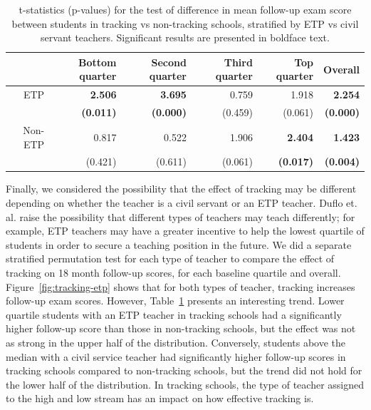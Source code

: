 \documentclass[11pt]{article}
\begin{document}
\begin{table}[ht]
\centering
\begin{tabular}{rrrrrr}
  \hline
 & Bottom quarter & Second quarter & Third quarter & Top quarter & Overall \\ 
  \hline
  ETP & {\bf 2.506} & {\bf 3.695} & 0.759 & 1.918 & {\bf 2.254 }\\ \vspace{2mm}
   & {\bf(0.011)} & {\bf (0.000) }& (0.459) & (0.061) & {\bf (0.000) }\\ 
  Non-ETP & 0.817 & 0.522 & 1.906 & {\bf 2.404 }& {\bf 1.423} \\ 
   & (0.421) & (0.611) & (0.061) & {\bf (0.017)} & {\bf (0.004)} \\ 
   \hline
\end{tabular}
\caption{t-statistics (p-values) for the test of difference in mean follow-up exam score between students in tracking vs non-tracking schools, stratified by ETP vs civil servant teachers. Significant results are presented in boldface text.}  \label{tab:tracking-etp}
\end{table} %

Finally, we considered the possibility that the effect of tracking may be different depending on whether the teacher is a civil servant or an ETP teacher. Duflo et. al. raise the possibility that different types of teachers may teach differently; for example, ETP teachers may have a greater incentive to help the lowest quartile of students in order to secure a teaching position in the future. We did a separate stratified permutation test for each type of teacher to compare the effect of tracking on 18 month follow-up scores, for each baseline quartile and overall.  Figure~\ref{fig:tracking-etp} shows that for both types of teacher, tracking increases follow-up exam scores.  However, Table~\ref{tab:tracking-etp} presents an interesting trend.  Lower quartile students with an ETP teacher in tracking schools had a significantly higher follow-up score than those in non-tracking schools, but the effect was not as strong in the upper half of the distribution.  Conversely, students above the median with a civil service teacher had significantly higher follow-up scores in tracking schools compared to non-tracking schools, but the trend did not hold for the lower half of the distribution.  In tracking schools, the type of teacher assigned to the high and low stream has an impact on how effective tracking is.
\end{document}

